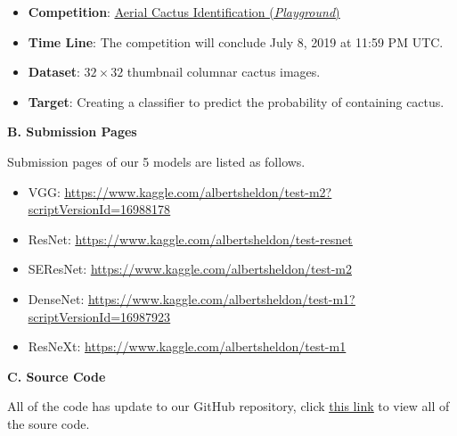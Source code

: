 \documentclass[a4paper]{article}
\begin{document}
\large{
\begin{itemize}
    \item \textbf{Competition}: \underline{\href{https://www.kaggle.com/c/aerial-cactus-identification/overview}{Aerial Cactus Identification (\emph{Playground})}}
    \item \textbf{Time Line}: The competition will conclude July 8, 2019 at 11:59 PM UTC. 
    \item \textbf{Dataset}: $32 \times 32$ thumbnail columnar cactus images.
    \item \textbf{Target}: Creating a classifier to predict the probability of containing cactus.
\end{itemize}
}

\vspace{5mm}
\begin{center}
\large\textbf{B. Submission Pages} \\
\end{center}


\vspace{2mm}
\large{
Submission pages of our 5 models are listed as follows.
\begin{itemize}
    \item \textsf{VGG}:  \underline{\href{https://www.kaggle.com/albertsheldon/test-m2?scriptVersionId=16988178}{https://www.kaggle.com/albertsheldon/test-m2?scriptVersionId=16988178}}
    \item \textsf{ResNet}: \underline{\href{https://www.kaggle.com/albertsheldon/test-resnet}{https://www.kaggle.com/albertsheldon/test-resnet}}
    \item \textsf{SEResNet}: \underline{\href{https://www.kaggle.com/albertsheldon/test-m2}{https://www.kaggle.com/albertsheldon/test-m2}}
    \item \textsf{DenseNet}: \underline{\href{https://www.kaggle.com/albertsheldon/test-m1?scriptVersionId=16987923}{https://www.kaggle.com/albertsheldon/test-m1?scriptVersionId=16987923}}
    \item \textsf{ResNeXt}: \underline{\href{https://www.kaggle.com/albertsheldon/test-m1}{https://www.kaggle.com/albertsheldon/test-m1}}
\end{itemize}
}

\vspace{5mm}
\begin{center}
\large\textbf{C. Source Code} \\
\end{center}

\large{All of the code has update to our GitHub repository, click \href{https://github.com/LovelyBuggies/Jupyter_DeepLearning_Homework/tree/master/Identify-Cactus/project/src}{\underline{this link}} to view all of the soure code.}
\end{document}
